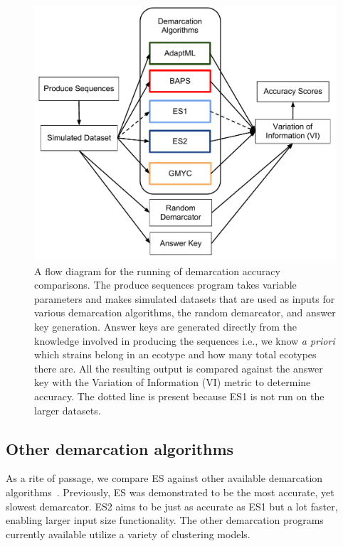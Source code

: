 \begin{figure}[h!]
\centering
\includegraphics[scale=0.75]{images/DemarcationComparisonsFlow-CH4}
\caption[Demarcation comparison flow diagram.]{A flow diagram for the running of demarcation accuracy comparisons. The produce sequences program takes variable parameters and makes simulated datasets that are used as inputs for various demarcation algorithms, the random demarcator, and answer key generation. Answer keys are generated directly from the knowledge involved in producing the sequences i.e., we know \emph{a priori} which strains belong in an ecotype and how many total ecotypes there are. All the resulting output is compared against the answer key with the Variation of Information (VI) metric to determine accuracy. The dotted line is present because ES1 is not run on the larger datasets.}
\label{fig:ComparisonFlow}
\end{figure}

\subsection*{Other demarcation algorithms}
As a rite of passage, we compare ES against other available demarcation algorithms~\cite{carlo}.
Previously, ES was demonstrated to be the most accurate, yet slowest demarcator.
ES2 aims to be just as accurate as ES1 but a lot faster, enabling larger input size functionality.
The other demarcation programs currently available utilize a variety of clustering models.

